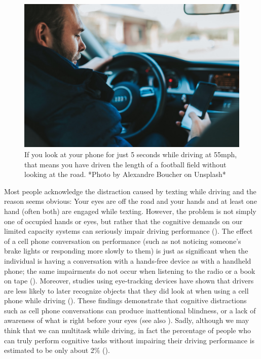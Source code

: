\documentclass[
]{krantz}
\begin{document}
\begin{figure}

{\centering \includegraphics[width=0.5\linewidth]{images/3_attention/driving} 

}

\caption{If you look at your phone for just 5 seconds while driving at 55mph, that means you have driven the length of a football field without looking at the road. *Photo by Alexandre Boucher on Unsplash*}\label{fig:driving}
\end{figure}

Most people acknowledge the distraction caused by texting while driving and the reason seems obvious: Your eyes are off the road and your hands and at least one hand (often both) are engaged while texting. However, the problem is not simply one of occupied hands or eyes, but rather that the cognitive demands on our limited capacity systems can seriously impair driving performance (). The effect of a cell phone conversation on performance (such as not noticing someone's brake lights or responding more slowly to them) is just as significant when the individual is having a conversation with a hands-free device as with a handheld phone; the same impairments do not occur when listening to the radio or a book on tape (). Moreover, studies using eye-tracking devices have shown that drivers are less likely to later recognize objects that they did look at when using a cell phone while driving (). These findings demonstrate that cognitive distractions such as cell phone conversations can produce inattentional blindness, or a lack of awareness of what is right before your eyes (see also ). Sadly, although we may think that we can multitask while driving, in fact the percentage of people who can truly perform cognitive tasks without impairing their driving performance is estimated to be only about 2\% ().
\end{document}
